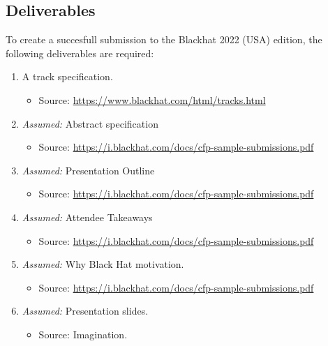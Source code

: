 \subsection{Deliverables}
To create a succesfull submission to the Blackhat 2022 (USA) edition, the following deliverables are required:
\begin{enumerate}
	\item A track specification.
	\begin{itemize}
		\item Source: \url{https://www.blackhat.com/html/tracks.html}
	\end{itemize}
	
	\item \textit{Assumed:} Abstract specification
	\begin{itemize}
		\item Source: \url{https://i.blackhat.com/docs/cfp-sample-submissions.pdf}
	\end{itemize}
	
	\item \textit{Assumed:} Presentation Outline
	\begin{itemize}
		\item Source: \url{https://i.blackhat.com/docs/cfp-sample-submissions.pdf}
	\end{itemize}

	\item \textit{Assumed:} Attendee Takeaways
	\begin{itemize}
		\item Source: \url{https://i.blackhat.com/docs/cfp-sample-submissions.pdf}
	\end{itemize}

	\item \textit{Assumed:} Why Black Hat motivation.
	\begin{itemize}
		\item Source: \url{https://i.blackhat.com/docs/cfp-sample-submissions.pdf}
	\end{itemize}
	
	\item \textit{Assumed:} Presentation slides.
	\begin{itemize}
		\item Source: Imagination.
	\end{itemize}
\end{enumerate}


